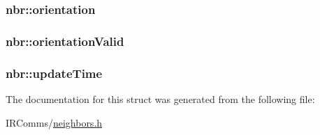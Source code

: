 \label{structnbr_a6c7ea3d28f851ec31c8e0e3701a1a881}
\hypertarget{structnbr_a4939850ec42f8949427cb6dd0cf688d9}{
\subsubsection[{orientation}]{ {\bf nbr::orientation}}}
\label{structnbr_a4939850ec42f8949427cb6dd0cf688d9}
\hypertarget{structnbr_a16b5e05a30261351b0283ecb54fa3ef2}{
\subsubsection[{orientationValid}]{ {\bf nbr::orientationValid}}}
\label{structnbr_a16b5e05a30261351b0283ecb54fa3ef2}
\hypertarget{structnbr_a96e15d768d6d2dd96cbcbd7b91d359c2}{
\subsubsection[{updateTime}]{ {\bf nbr::updateTime}}}
\label{structnbr_a96e15d768d6d2dd96cbcbd7b91d359c2}


The documentation for this struct was generated from the following file:\begin{DoxyCompactItemize}
\item 
IRComms/\hyperlink{neighbors_8h}{neighbors.h}\end{DoxyCompactItemize}
